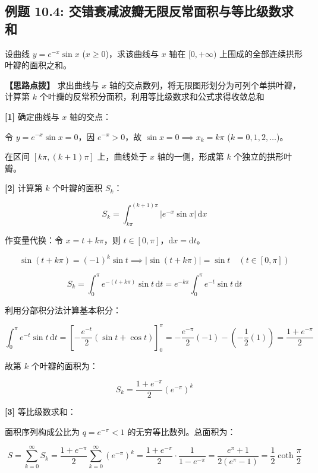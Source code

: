 \documentclass[11pt,a4paper,UTF8]{ctexart}
\begin{document}
\subsection{例题 10.4: 交错衰减波瓣无限反常面积与等比级数求和}

设曲线 $y = e^{-x}\sin x$ ($x \geqslant 0$)，求该曲线与 $x$ 轴在 $[0, +\infty)$ 上围成的全部连续拱形叶瓣的面积之和。

\textbf{\color{DeepPurple}【思路点拨】} 求出曲线与 $x$ 轴的交点数列，将无限图形划分为可列个单拱叶瓣，计算第 $k$ 个叶瓣的反常积分面积，利用等比级数求和公式求得收敛总和


\begin{solbox}[分步推导与答题规范]
\textbf{[1]} 确定曲线与 $x$ 轴的交点：

令 $y = e^{-x}\sin x = 0$，因 $e^{-x} > 0$，故 $\sin x = 0 \implies x_k = k\pi$ ($k = 0, 1, 2, \dots$)。

在区间 $[k\pi, (k+1)\pi]$ 上，曲线处于 $x$ 轴的一侧，形成第 $k$ 个独立的拱形叶瓣。

\textbf{[2]} 计算第 $k$ 个叶瓣的面积 $S_k$：


\begin{equation*}
S_k = \int_{k\pi}^{(k+1)\pi} |e^{-x}\sin x|\,\mathrm{d}x
\end{equation*}


作变量代换：令 $x = t + k\pi$，则 $t \in [0, \pi]$，$\mathrm{d}x = \mathrm{d}t$。


\begin{equation*}
\sin(t+k\pi) = (-1)^k \sin t \implies |\sin(t+k\pi)| = \sin t \quad (t \in [0, \pi])
\end{equation*}



\begin{equation*}
S_k = \int_0^\pi e^{-(t+k\pi)}\sin t\,\mathrm{d}t = e^{-k\pi}\int_0^\pi e^{-t}\sin t\,\mathrm{d}t
\end{equation*}


利用分部积分法计算基本积分：


\begin{equation*}
\int_0^\pi e^{-t}\sin t\,\mathrm{d}t = \left[-\frac{e^{-t}}{2}(\sin t + \cos t)\right]_0^\pi = -\frac{e^{-\pi}}{2}(-1) - \left(-\frac{1}{2}(1)\right) = \frac{1+e^{-\pi}}{2}
\end{equation*}


故第 $k$ 个叶瓣的面积为：


\begin{equation*}
S_k = \frac{1+e^{-\pi}}{2} (e^{-\pi})^k
\end{equation*}


\textbf{[3]} 等比级数求和：

面积序列构成公比为 $q = e^{-\pi} < 1$ 的无穷等比数列。总面积为：


\begin{equation*}
S = \sum_{k=0}^\infty S_k = \frac{1+e^{-\pi}}{2} \sum_{k=0}^\infty (e^{-\pi})^k = \frac{1+e^{-\pi}}{2} \cdot \frac{1}{1 - e^{-\pi}} = \frac{e^\pi+1}{2(e^\pi-1)} = \frac{1}{2}\coth\frac{\pi}{2}
\end{equation*}

\end{solbox}
\end{document}
